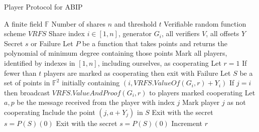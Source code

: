 \documentclass{dalcsthesis}
\begin{document}
\begin{algorithm}
  \caption{Player Protocol for ABIP}
  \label{alg:ABIP:Player}
  \begin{algorithmic}
    \INPUT A finite field $\mathbb{F}$
    \INPUT Number of shares $n$ and threshold $t$
    \INPUT Verifiable random function scheme $VRFS$
    \INPUT Share index $i \in [1, n]$, generator $G_i$, all verifiers $V$, all offsets $Y$
    \OUTPUT Secret $s$ or Failure
    \STATE Let $P$ be a function that takes points and returns the polynomial of minimum degree containing those points 
    \STATE Mark all players, identified by indexes in $[1, n]$, including ourselves, as cooperating
    \STATE Let $r = 1$
      \STATE If fewer than $t$ players are marked as cooperating then exit with Failure
      \STATE Let $S$ be a set of points in $\mathbb{F}^2$ initially containing $(i, VRFS.ValueOf(G_i, r) + Y_i)$
        \STATE If $j = i$ then broadcast $VRFS.ValueAndProof(G_i, r)$ to players marked cooperating
        \STATE Let $a, p$ be the message received from the player with index $j$
          \STATE Mark player $j$ as not cooperating
        \ELSE
          \STATE Include the point $(j, a + Y_j)$ in $S$
            \STATE Exit with the secret $s = P(S)(0)$
          \ENDIF
        \ENDIF
      \ENDFOR
        \STATE Exit with the secret $s = P(S)(0)$
      \ENDIF
      \STATE Increment $r$
    \ENDWHILE
  \end{algorithmic}
\end{algorithm}
\end{document}
